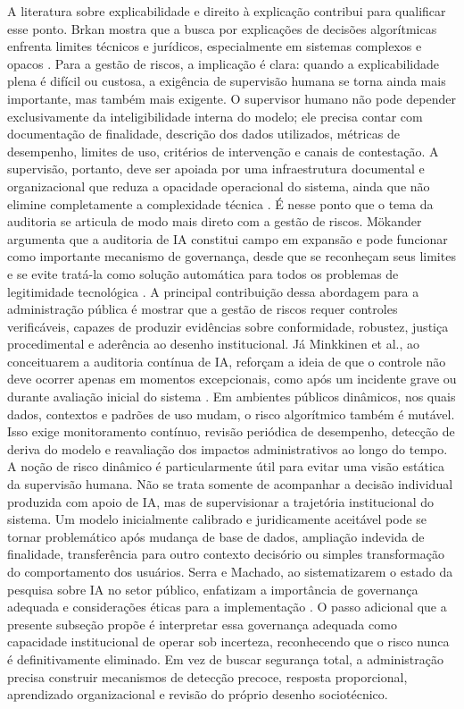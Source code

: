 \documentclass[12pt,a4paper]{article}
\begin{document}
A literatura sobre explicabilidade e direito à explicação contribui para qualificar esse ponto. Brkan mostra que a busca por explicações de decisões algorítmicas enfrenta limites técnicos e jurídicos, especialmente em sistemas complexos e opacos \autocite{brkan2020legal}. Para a gestão de riscos, a implicação é clara: quando a explicabilidade plena é difícil ou custosa, a exigência de supervisão humana se torna ainda mais importante, mas também mais exigente. O supervisor humano não pode depender exclusivamente da inteligibilidade interna do modelo; ele precisa contar com documentação de finalidade, descrição dos dados utilizados, métricas de desempenho, limites de uso, critérios de intervenção e canais de contestação. A supervisão, portanto, deve ser apoiada por uma infraestrutura documental e organizacional que reduza a opacidade operacional do sistema, ainda que não elimine completamente a complexidade técnica \autocite{mkander2023auditing}.
É nesse ponto que o tema da auditoria se articula de modo mais direto com a gestão de riscos. Mökander argumenta que a auditoria de IA constitui campo em expansão e pode funcionar como importante mecanismo de governança, desde que se reconheçam seus limites e se evite tratá-la como solução automática para todos os problemas de legitimidade tecnológica \autocite{mkander2023auditing}. A principal contribuição dessa abordagem para a administração pública é mostrar que a gestão de riscos requer controles verificáveis, capazes de produzir evidências sobre conformidade, robustez, justiça procedimental e aderência ao desenho institucional. Já Minkkinen et al., ao conceituarem a auditoria contínua de IA, reforçam a ideia de que o controle não deve ocorrer apenas em momentos excepcionais, como após um incidente grave ou durante avaliação inicial do sistema \autocite{minkkinen2022continuous}. Em ambientes públicos dinâmicos, nos quais dados, contextos e padrões de uso mudam, o risco algorítmico também é mutável. Isso exige monitoramento contínuo, revisão periódica de desempenho, detecção de deriva do modelo e reavaliação dos impactos administrativos ao longo do tempo.
A noção de risco dinâmico é particularmente útil para evitar uma visão estática da supervisão humana. Não se trata somente de acompanhar a decisão individual produzida com apoio de IA, mas de supervisionar a trajetória institucional do sistema. Um modelo inicialmente calibrado e juridicamente aceitável pode se tornar problemático após mudança de base de dados, ampliação indevida de finalidade, transferência para outro contexto decisório ou simples transformação do comportamento dos usuários. Serra e Machado, ao sistematizarem o estado da pesquisa sobre IA no setor público, enfatizam a importância de governança adequada e considerações éticas para a implementação \autocite{serra2024a}. O passo adicional que a presente subseção propõe é interpretar essa governança adequada como capacidade institucional de operar sob incerteza, reconhecendo que o risco nunca é definitivamente eliminado. Em vez de buscar segurança total, a administração precisa construir mecanismos de detecção precoce, resposta proporcional, aprendizado organizacional e revisão do próprio desenho sociotécnico.
\end{document}
